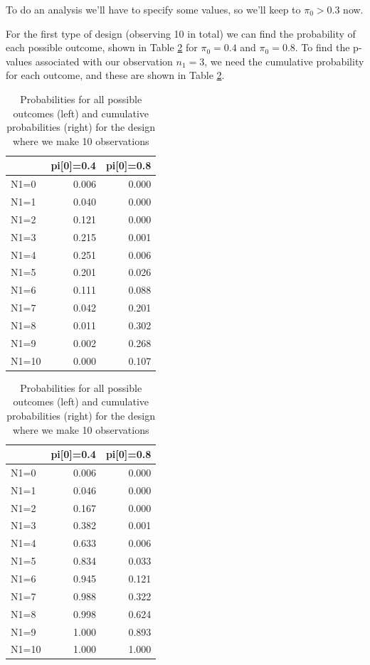 \documentclass[
  openany]{book}
\theoremstyle{definition}
\theoremstyle{definition}
\theoremstyle{definition}
\theoremstyle{definition}
\theoremstyle{remark}
\begin{document}
To do an analysis we'll have to specify some values, so we'll keep to \(\pi_0>0.3\) now.

For the first type of design (observing 10 in total) we can find the probability of each possible outcome, shown in Table \ref{tab:bin1} for \(\pi_0=0.4\) and \(\pi_0=0.8\). To find the p-values associated with our observation \(n_1=3\), we need the cumulative probability for each outcome, and these are shown in Table \ref{tab:bin1}.

\begin{table}
\caption{\label{tab:bin1}Probabilities for all possible outcomes (left) and cumulative probabilities (right) for the design where we make 10 observations}

\centering
\begin{tabular}[t]{lrr}
\toprule
  & pi[0]=0.4 & pi[0]=0.8\\
\midrule
N1=0 & 0.006 & 0.000\\
N1=1 & 0.040 & 0.000\\
N1=2 & 0.121 & 0.000\\
N1=3 & 0.215 & 0.001\\
N1=4 & 0.251 & 0.006\\
\addlinespace
N1=5 & 0.201 & 0.026\\
N1=6 & 0.111 & 0.088\\
N1=7 & 0.042 & 0.201\\
N1=8 & 0.011 & 0.302\\
N1=9 & 0.002 & 0.268\\
\addlinespace
N1=10 & 0.000 & 0.107\\
\bottomrule
\end{tabular}
\centering
\begin{tabular}[t]{lrr}
\toprule
  & pi[0]=0.4 & pi[0]=0.8\\
\midrule
N1=0 & 0.006 & 0.000\\
N1=1 & 0.046 & 0.000\\
N1=2 & 0.167 & 0.000\\
N1=3 & 0.382 & 0.001\\
N1=4 & 0.633 & 0.006\\
\addlinespace
N1=5 & 0.834 & 0.033\\
N1=6 & 0.945 & 0.121\\
N1=7 & 0.988 & 0.322\\
N1=8 & 0.998 & 0.624\\
N1=9 & 1.000 & 0.893\\
\addlinespace
N1=10 & 1.000 & 1.000\\
\bottomrule
\end{tabular}
\end{table}
\end{document}
